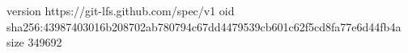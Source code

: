 version https://git-lfs.github.com/spec/v1
oid sha256:43987403016b208702ab780794c67dd4479539cb601c62f5cd8fa77e6d44fb4a
size 349692
